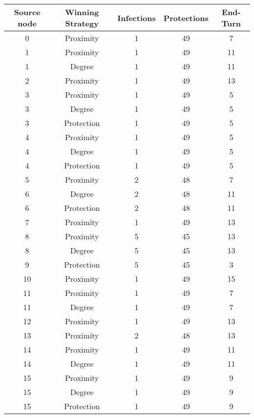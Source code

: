 \documentclass[results.tex]{subfiles}
\begin{document}
\begin{center}
  \begin{tabular}{| c || c | c | c | c |}
    \hline
    {\bfseries Source node} & {\bfseries Winning Strategy} & {\bfseries Infections} & {\bfseries Protections} & {\bfseries End-Turn} \\  %
    \hline\hline
    0 & Proximity & 1 & 49 & 7 \\ 
    \hline
    1 & Proximity & 1 & 49 & 11 \\ 
    \hline
    1 & Degree & 1 & 49 & 11 \\ 
    \hline
    2 & Proximity & 1 & 49 & 13 \\ 
    \hline
    3 & Proximity & 1 & 49 & 5 \\ 
    \hline
    3 & Degree & 1 & 49 & 5 \\ 
    \hline
    3 & Protection & 1 & 49 & 5 \\ 
    \hline
    4 & Proximity & 1 & 49 & 5 \\ 
    \hline
    4 & Degree & 1 & 49 & 5 \\ 
    \hline
    4 & Protection & 1 & 49 & 5 \\ 
    \hline
    5 & Proximity & 2 & 48 & 7 \\ 
    \hline
    6 & Degree & 2 & 48 & 11 \\ 
    \hline
    6 & Protection & 2 & 48 & 11 \\ 
    \hline
    7 & Proximity & 1 & 49 & 13 \\ 
    \hline
    8 & Proximity & 5 & 45 & 13 \\ 
    \hline
    8 & Degree & 5 & 45 & 13 \\ 
    \hline
    9 & Protection & 5 & 45 & 3 \\ 
    \hline
    10 & Proximity & 1 & 49 & 15 \\ 
    \hline
    11 & Proximity & 1 & 49 & 7 \\ 
    \hline
    11 & Degree & 1 & 49 & 7 \\ 
    \hline
    12 & Proximity & 1 & 49 & 13 \\ 
    \hline
    13 & Proximity & 2 & 48 & 13 \\ 
    \hline
    14 & Proximity & 1 & 49 & 11 \\ 
    \hline
    14 & Degree & 1 & 49 & 11 \\ 
    \hline
    15 & Proximity & 1 & 49 & 9 \\ 
    \hline
    15 & Degree & 1 & 49 & 9 \\ 
    \hline
    15 & Protection & 1 & 49 & 9 \\ 

\end{tabular}
\end{center}
\end{document}
